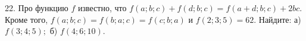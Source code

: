 22. Про функцию $f$ известно, что $f(a;b;c)+f(d;b;c)=f(a+d;b;c)+2bc.$ Кроме того, $f(a;b;c)=f(b;a;c)=f(c;b;a)$ и $f(2;3;5)=62.$ Найдите: а) $f(3;4;5);$
б) $f(4;6;10).$\\
